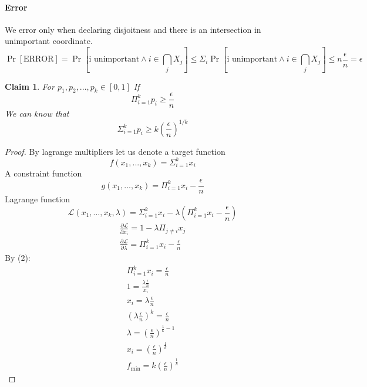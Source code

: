 \documentclass{article}
\theoremstyle{plain}
\newtheorem{claim}{Claim}
\begin{document}
\paragraph{Error}
We error only when declaring disjoitness and there is an intersection in unimportant coordinate.
\begin{equation*}
    \Pr[\text{ERROR}] = \Pr[\text{i unimportant} \land i \in \bigcap_j X_j] \leq \Sigma_i \Pr[\text{i unimportant} \land i \in \bigcap
    _j X_j] \leq n\frac{\epsilon}{n} = \epsilon
\end{equation*}
\begin{claim}
For $p_1, p_2, ... , p_k \in [0,1]$ \newline
If
\begin{equation*}
    \Pi_{i=1}^{k}p_i \geq \frac{\epsilon}{n}
\end{equation*}
We can know that
\begin{equation*}
    \Sigma_{i=1}^{k}p_i \geq k\left(\frac{\epsilon}{n}\right)^{1/k}
\end{equation*}
\end{claim}
\begin{proof}
By lagrange multipliers let us denote a target function 
\begin{equation*}
    f(x_1, ... , x_k) = \Sigma_{i=1}^{k}x_i
\end{equation*}
A constraint function
\begin{equation*}
    g(x_1, ... , x_k) = \Pi_{i=1}^{k}x_i - \frac{\epsilon}{n} 
\end{equation*}
Lagrange function
\begin{equation*}
    \mathcal{L}(x_1, ... , x_k, \lambda) = \Sigma_{i=1}^{k}x_i - \lambda\left(\Pi_{i=1}^{k}x_i - \frac{\epsilon}{n}  \right)
\end{equation*}
\begin{align*}
    \frac{\partial\mathcal{L}}{\partial x_i} = 1 - \lambda\Pi_{j \neq i}x_j  \\
    \frac{\partial\mathcal{L}}{\partial \lambda} = \Pi_{i=1}^{k}x_i - \frac{\epsilon}{n}
\end{align*}
By (2):
\begin{align*}
    \Pi_{i=1}^{k}x_i = \frac{\epsilon}{n} \\
    1 = \frac{\lambda\frac{\epsilon}{n}}{x_i} \\ 
    x_i = \lambda\frac{\epsilon}{n} \\
    \left(\lambda\frac{\epsilon}{n}\right)^k = \frac{\epsilon}{n} \\
    \lambda = \left(\frac{\epsilon}{n}\right)^{\frac{1}{k} - 1} \\
    x_i = \left(\frac{\epsilon}{n}\right)^{\frac{1}{k}} \\
    f_{\text{min}} = k\left(\frac{\epsilon}{n}\right)^{\frac{1}{k}}
\end{align*}
\end{proof}
\end{document}

